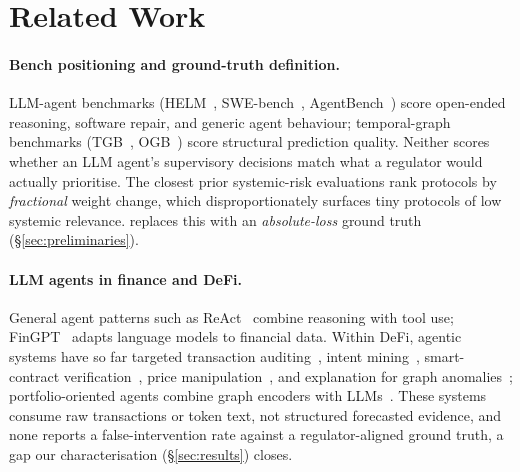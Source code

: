 \section{Related Work}
\label{sec:related}

\paragraph{Bench positioning and ground-truth definition.}
LLM-agent benchmarks (HELM~\citep{liang2022helm},
SWE-bench~\citep{jimenez2024swebench},
AgentBench~\citep{liu2024agentbench}) score open-ended reasoning,
software repair, and generic agent behaviour; temporal-graph
benchmarks (TGB~\citep{huang2023tgb}, OGB~\citep{hu2020ogb}) score
structural prediction quality. Neither scores whether an LLM agent's
supervisory decisions match what a regulator would actually
prioritise. The closest prior systemic-risk evaluations
\citep{BERTOMEU2024105321,gonon2025computingsystemicriskmeasures,
li2025hgmae} rank protocols by \emph{fractional} weight change, which
disproportionately surfaces tiny protocols of low systemic relevance.
\benchname{} replaces this with an \emph{absolute-loss} ground
truth (\S\ref{sec:preliminaries}).

\paragraph{LLM agents in finance and DeFi.}
General agent patterns such as ReAct~\citep{YaoEtAl2023ReAct}
combine reasoning with tool use; FinGPT~\citep{YangEtAl2023FinGPT}
adapts language models to financial data. Within DeFi, agentic
systems have so far targeted transaction
auditing~\citep{yao2025arbiter}, intent
mining~\citep{mao2025knowyourintent}, smart-contract
verification~\citep{hu2026heimdallr,kong2026knowdit}, price
manipulation~\citep{liu2025pmdetector}, and explanation for graph
anomalies~\citep{watson2025explainfirst}; portfolio-oriented agents
combine graph encoders with LLMs~\citep{luo2025llmcrypto,
jeon2026blindtrade}. These systems consume raw transactions or token
text, not structured forecasted evidence, and none reports a
false-intervention rate against a regulator-aligned ground truth, a
gap our characterisation (\S\ref{sec:results}) closes.


